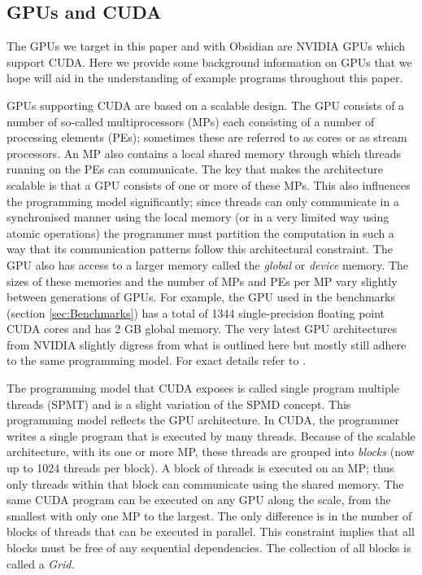\subsection{GPUs and CUDA} 

The GPUs we target in this paper and with Obsidian are NVIDIA GPUs which
support CUDA. Here we provide some background information on GPUs 
that we hope will aid in the understanding of example programs throughout this paper. 


GPUs supporting CUDA are based on a scalable design. The GPU consists of a 
number of so-called multiprocessors (MPs) each consisting of a number of 
processing elements (PEs); sometimes these are referred to as cores or as 
stream processors. An MP also contains a local shared memory through which 
threads running on the PEs can communicate. The key that 
makes the architecture scalable is that a GPU consists of one or more 
of these MPs. This also influences the programming model significantly; since
threads can only communicate in a synchronised manner using the local memory 
(or in a very limited way using atomic operations) the programmer must 
partition the computation in such a way that its communication patterns 
follow this architectural constraint. The GPU also has access to a larger 
memory called the {\em global} or {\em device} memory. The sizes of these 
memories and the number of MPs and PEs per MP vary slightly between 
generations of GPUs. For example, the GPU used in the benchmarks 
(section \ref{sec:Benchmarks}) has a total of 1344 single-precision floating
point CUDA cores and has 2 GB global memory. The very latest GPU architectures 
from NVIDIA slightly digress from what is outlined here but mostly still 
adhere to the same programming model. For exact details refer to \cite{KEPLER}.  

The programming model that CUDA exposes is called single program multiple 
threads (SPMT) and is a slight variation of the SPMD concept. This programming 
model reflects the GPU architecture. In CUDA, the programmer writes a single 
program that is executed by many threads. Because of the scalable architecture,
with its one or more MP, these threads are grouped into {\em blocks} 
(now up to 1024 threads per block). A block of threads is executed on an MP; 
thus only threads within that block can communicate using the shared memory. 
The same CUDA program can be executed on any GPU along the scale, from the 
smallest with only one MP to the largest. The only difference is in the number 
of blocks of threads that can be executed in parallel. This constraint implies 
that all blocks must be free of any sequential dependencies. The collection of 
all blocks is called a {\em Grid}.

